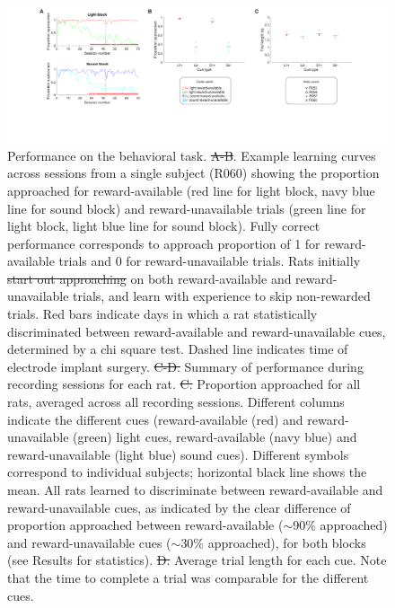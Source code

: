\documentclass[11pt]{article}
\newcommand{\bsf}[1]{\textbf{#1}}
\providecommand{\DIFadd}[1]{{\protect\color{blue}\uwave{#1}}} %
\providecommand{\DIFdel}[1]{{\protect\color{red}\sout{#1}}}                      %
\providecommand{\DIFaddFL}[1]{\DIFadd{#1}} %
\providecommand{\DIFdelFL}[1]{\DIFdel{#1}} %
\providecommand{\DIFaddbeginFL}{} %
\providecommand{\DIFaddendFL}{} %
\providecommand{\DIFdelbeginFL}{} %
\providecommand{\DIFdelendFL}{} %
\newcommand{\DIFscaledelfig}{0.5}
\newlength{\DIFdelgraphicswidth} %
\newlength{\DIFdelgraphicsheight} %
\newcommand{\DIFaddincludegraphics}[2][]{{\color{blue}\fbox{\DIFOincludegraphics[#1]{#2}}}} %
\newcommand{\DIFdelincludegraphics}[2][]{%
\sbox{\DIFdelgraphicsbox}{\DIFOincludegraphics[#1]{#2}}%
\settoboxwidth{\DIFdelgraphicswidth}{\DIFdelgraphicsbox} %
\settoboxtotalheight{\DIFdelgraphicsheight}{\DIFdelgraphicsbox} %
\scalebox{\DIFscaledelfig}{%
\parbox[b]{\DIFdelgraphicswidth}{\usebox{\DIFdelgraphicsbox}\\[-\baselineskip] \rule{\DIFdelgraphicswidth}{0em}}\llap{\resizebox{\DIFdelgraphicswidth}{\DIFdelgraphicsheight}{%
\setlength{\unitlength}{\DIFdelgraphicswidth}%
\begin{picture}(1,1)%
\thicklines\linethickness{2pt} %
{\color[rgb]{1,0,0}\put(0,0){\framebox(1,1){}}}%
{\color[rgb]{1,0,0}\put(0,0){\line( 1,1){1}}}%
{\color[rgb]{1,0,0}\put(0,1){\line(1,-1){1}}}%
\end{picture}%
}\hspace*{3pt}}} %
} %
\DeclareRobustCommand{\DIFaddbeginFL}{\DIFOaddbeginFL \let\includegraphics\DIFaddincludegraphics} %
\DeclareRobustCommand{\DIFaddendFL}{\DIFOaddendFL \let\includegraphics\DIFOincludegraphics} %
\DeclareRobustCommand{\DIFdelbeginFL}{\DIFOdelbeginFL \let\includegraphics\DIFdelincludegraphics} %
\DeclareRobustCommand{\DIFdelendFL}{\DIFOaddendFL \let\includegraphics\DIFOincludegraphics} %
\begin{document}
{\begin{figure}[h]
\centering
\includegraphics[width=\textwidth]{Fig 4 - Behavioral results.png}
\caption{Performance on the behavioral task. \DIFdelbeginFL \DIFdelFL{A-B}\DIFdelendFL \DIFaddbeginFL \DIFaddFL{\bsf{A-B}}\DIFaddendFL . Example learning curves
  across sessions from a single subject (R060) showing the proportion approached
  for reward-available (red line for light block, navy blue line for sound
  block) and reward-unavailable trials (green line for light block, light blue
  line for sound block). Fully correct performance corresponds to approach
  proportion of 1 for reward-available trials and 0 for reward-unavailable
  trials. Rats initially \DIFdelbeginFL \DIFdelFL{start out approaching }\DIFdelendFL \DIFaddbeginFL \DIFaddFL{approach }\DIFaddendFL on both reward-available and
  reward-unavailable trials, and learn with experience to skip non-rewarded
  trials. Red bars indicate days in which a rat statistically discriminated
  between reward-available and reward-unavailable cues, determined by a chi
  square test. Dashed line indicates time of electrode implant
  surgery. \DIFdelbeginFL \DIFdelFL{C-D. }\DIFdelendFL \DIFaddbeginFL \DIFaddFL{\bsf{C-D}: }\DIFaddendFL Summary of performance during recording sessions for each
  rat. \DIFdelbeginFL \DIFdelFL{C. }\DIFdelendFL \DIFaddbeginFL \DIFaddFL{\bsf{C}: }\DIFaddendFL Proportion approached for all rats, averaged across all
  recording sessions. Different columns indicate the different cues
  (reward-available (red) and reward-unavailable (green) light cues,
  reward-available (navy blue) and reward-unavailable (light blue) sound
  cues). Different symbols correspond to individual subjects; horizontal black
  line shows the mean. All rats learned to discriminate between reward-available
  and reward-unavailable cues, as indicated by the clear difference of
  proportion approached between reward-available ($\sim$90\% approached) and
  reward-unavailable cues ($\sim$30\% approached), for both blocks (see Results
  for statistics). \DIFdelbeginFL \DIFdelFL{D. }\DIFdelendFL \DIFaddbeginFL \DIFaddFL{\bsf{D}: }\DIFaddendFL Average trial length for each cue. Note that the
  time to complete a trial was comparable for the different cues.}
\label{fig:behav}
\end{figure}
}
\end{document}

